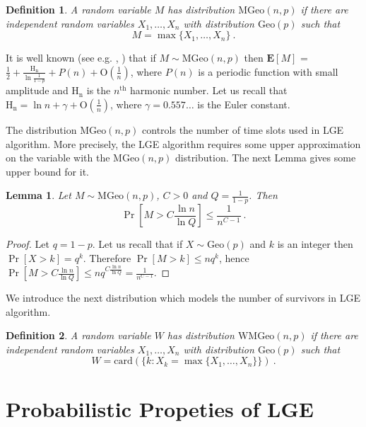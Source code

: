 \documentclass[proceedings]{dmtcs}
\newtheorem{definition}{Definition}
\newtheorem{lemma}{Lemma}
\newcommand{\E}[1]{\mathbf{E}\left[#1\right]}
\newcommand{\Geo}[1]{\mathrm{Geo}(#1)}
\newcommand{\MGeo}[2]{\mathrm{MGeo}(#1,#2)}
\newcommand{\WGeo}[2]{\mathrm{WMGeo}(#1,#2)}
\newcommand{\HarmonicN}[1]{\mathrm{H_{#1}}}
\newcommand{\BigO}[1]{\mathrm{O}\left(#1\right)}
\newcommand{\card}[1]{\mathrm{card}\left(#1\right)}
\begin{document}
\begin{definition}
A random variable $M$ has distribution $\MGeo{n}{p}$ if there are independent random variables 
$X_1,\ldots,X_n$ with distribution $\Geo{p}$ such that $$M = \max\{X_1,\ldots,X_n\}~.$$
\end{definition}

It is well known  (see e.g. \cite{Szpankowski:1990:YAB:78907.78914},
\cite{DBLP:journals/fuin/CichonK13}) that if $M \sim \MGeo{n}{p}$ then
$\E{M}$ = $\frac12 + \frac{\HarmonicN{n}}{\ln \frac{1}{1-p}} + P(n) + \BigO{\frac1n}$, 
where $P(n)$ is a periodic function with small amplitude and $\HarmonicN{n}$ is the $n^{\mathrm{th}}$ harmonic number.
Let us recall that $\HarmonicN{n} = \ln n + \gamma + \BigO{\frac1n}$, where $\gamma = 0.557\ldots$ is the Euler constant.

The distribution $\MGeo{n}{p}$ controls the number of time slots used in LGE algorithm.
More precisely, the LGE algorithm requires some upper approximation on the variable 
with the $\MGeo{n}{p}$ distribution. The next Lemma gives some upper bound for it.

\begin{lemma}
\label{lemma:boundNumberRounds}
Let $M \sim \MGeo{n}{p}$, $C>0$ and $Q = \frac{1}{1-p}$. Then
$$\Pr[M>C \frac{\ln n}{\ln Q}] \leq \frac{1}{n^{C-1}}~.$$
\end{lemma}

\begin{proof}
Let $q=1-p$. Let us recall that if $X \sim \Geo{p}$ and $k$ is an integer then  $\Pr[X>k] = q^k$.
Therefore $\Pr[M>k] \leq n q^k$, hence
$\Pr\left[M>C \frac{\ln n}{\ln Q}\right] \leq n q^{C \frac{\ln n}{\ln Q}} = \frac{1}{n^{C-1}}$.
\end{proof}

We introduce the next distribution which models the number of survivors in LGE algorithm.

\begin{definition}
A random variable $W$ has distribution $\WGeo{n}{p}$ if there are independent random variables 
$X_1,\ldots,X_n$ with distribution $\Geo{p}$ such that 
$$
  W = \card{\{k: X_k = \max\{X_1,\ldots,X_n\}\}}~.
$$
\end{definition}



\section{Probabilistic Propeties of LGE}
\end{document}
